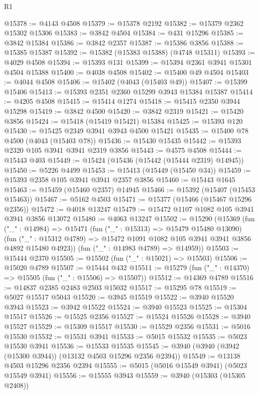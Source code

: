 \begin{lexlean}{R1}
\begin{coremodule}
@15378 := @4143 @4508
@15379 := @15378 @2192
@15382 := @15379 @2362 @15302 @15306
@15383 := @3842 @4504
@15384 := @431 @15296
@15385 := @3842 @15384
@15386 := @3842 @2357
@15387 := @15386 @3856
@15388 := @15385 @15387
@15392 := @15382 (@15383 @15388) (@4748 @15311)
@15393 := @4029 @4508
@15394 := @15393 @131
@15399 := @15394 @2361 @3941 @15301 @4504 @15388
@15400 := @4038 @4508
@15402 := @15400 @49 @4504
@15403 := @4044 @4508
@15406 := @15402 (@4043 (@15403 @49))
@15407 := @15399 @15406
@15413 := @15393 @2351 @2360 @15299 @3943 @15384 @15387
@15414 := @4205 @4508
@15415 := @15414 @1274
@15418 := @15415 @2350 @3944 @15298
@15419 := @3842 @4500
@15420 := @3842 @2319
@15421 := @15420 @3856
@15424 := @15418 (@15419 @15421) @15384
@15425 := @15393 @120
@15430 := @15425 @2349 @3941 @3943 @4500 @15421
@15435 := @15400 @78 @4500 (@4043 (@15403 @78))
@15436 := @15430 @15435
@15442 := @15393 @2320 @105 @3941 @3941 @2319 @3856
@15443 := @4575 @4508
@15444 := @15443 @403
@15449 := @15424 (@15436 (@15442 (@15444 @2319) @14945))
@15450 := @5226 @4499
@15453 := @15413 (@15449 (@15450 @34))
@15459 := @15393 @2358 @105 @3941 @3941 @2357 @3856
@15460 := @15443 @1645
@15463 := @15459 (@15460 @2357) @14945
@15466 := @15392 (@15407 (@15453 @15463))
@15467 := @5162 @4503
@15471 := @15377 (@15466 (@15467 @15296 @2356))
@15472 := @4018 @13247
@15479 := @15472 @1107 @1082 @105 @3941 @3941 @3856 @13072
@15480 := @4063 @13247
@15502 := @15290
    (@15369
      (fun ("_" : @14984) =>
      @15471
        (fun ("_" : @15313) => @15479 @15480 @13090)
        (fun ("_" : @15312 @4789) => @15472 @1091 @1082 @105 @3941 @3941 @3856 @4892 @15480 @4923))
      (fun ("_" : @14983 @4789) => @14959))
@15503 := @15444 @2370
@15505 := @15502 (fun ("_" : @15021) => @15503)
@15506 := @15020 @4789
@15507 := @15444 @432
@15511 := @15279 (fun ("_" : @14370) => @15505 (fun ("_" : @15506) => @15507))
@15512 := @14369 @4789
@15516 := @14837 @2385 @2483 @2503 @15032
@15517 := @15295 @78
@15519 := @5027 @15517 @5043
@15520 := @3945 @15519
@15522 := @3940 @15520 @3943
@15523 := @3942 @15522
@15524 := @3940 @15523
@15525 := @15304 @15517
@15526 := @15525 @2356
@15527 := @15524 @15526
@15528 := @3940 @15527
@15529 := @15309 @15517
@15530 := @15529 @2356
@15531 := @5016 @15530
@15532 := @15531 @3941
@15533 := @5015 @15532
@15535 := @5023 @15530 @3941
@15536 := @15533 @15535
@15545 := @3940 (@3940 (@3942 (@15300 @3944)) (@13132 @4503 @15296 @2356 @2394))
@15549 := @13138 @4503 @15296 @2356 @2394
@15555 := @5015 (@5016 @15549 @3941) (@5023 @15549 @3941)
@15556 := @15555 @3943
@15559 := @3940 (@15303 (@15305 @2408))

\end{coremodule}
\end{lexlean}
